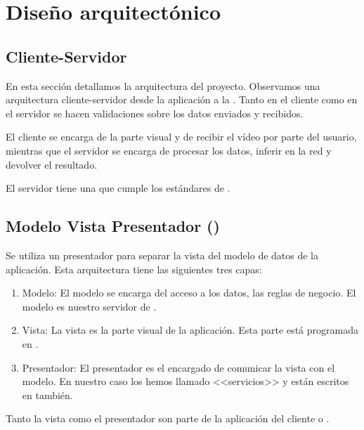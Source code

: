 
\section{Diseño arquitectónico}

\subsection{Cliente-Servidor}
En esta sección detallamos la arquitectura del proyecto. Observamos una arquitectura cliente-servidor desde la aplicación a la . Tanto en el cliente como en el servidor se hacen validaciones sobre los datos enviados y recibidos.

El cliente se encarga de la parte visual y de recibir el vídeo por parte del usuario, mientras que el servidor se encarga de procesar los datos, inferir en la red y devolver el resultado.

El servidor tiene una  que cumple los estándares de .

\subsection{Modelo Vista Presentador ()}

Se utiliza un presentador para separar la vista del modelo de datos de la aplicación. Esta arquitectura tiene las siguientes tres capas:

\begin{enumerate}
  \item Modelo: El modelo se encarga del acceso a los datos, las reglas de negocio. El modelo es nuestro servidor de .
  \item Vista: La vista es la parte visual de la aplicación. Esta parte está programada en .
  \item Presentador: El presentador es el encargado de comunicar la vista con el modelo. En nuestro caso los hemos llamado <<servicios>> y están escritos en  también.
\end{enumerate}

Tanto la vista como el presentador son parte de la aplicación del cliente o .